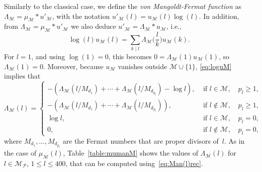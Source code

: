 \documentclass[11pt, a4paper]{article}
\newcommand{\calM}{\mathcal{M}}
\newcommand{\manM}{\Lambda_{\calM}}
\newcommand{\uM}{u_\calM}
\newcommand{\muM}{\mu_\calM}
\newcommand{\Mp}{\calM_{\mathcal{P}}}
\theoremstyle{plain}
\theoremstyle{definition}
\begin{document}
Similarly to the classical case, we define the \textit{von Mangoldt-Fermat function} as $\manM = \muM * u'_\calM$,
with the notation $u'_\calM(l) = \uM(l) \log(l)$.
In addition, from $\manM = \muM * u'_\calM$ we also deduce $u'_\calM = \manM * \uM$, i.e.,
\begin{equation}
\label{eq:loguM}
  \log(l) \uM (l) = \sum_{k \mid l} \manM\Big(\frac{l}{k}\Big)\uM(k).
\end{equation}
For $l=1$, and using $\log(1)=0$, this becomes $0 = \manM(1) \uM(1)$, so $\manM(1)=0$.
Moreover, because $\uM$ vanishes outside $\calM \cup \{1\}$, \eqref{eq:loguM} implies that
\begin{equation}
\label{eq:Man(l)rec}
  \manM(l) = 
  \begin{cases}
    -(\manM({l}/{M_{d_1}}) + \cdots + \manM({l}/{M_{d_{p_l}}}) - \log l),
    & \text{ if } l\in \calM, \quad p_{l} \geq 1, \\ 
    -(\manM({l}/{M_{d_1}}) + \cdots + \manM({l}/{M_{d_{p_l}}})),
    & \text{ if } l\notin \calM, \quad p_{l} \geq 1, \\ 
    \log l,
    & \text{ if } l\in \calM, \quad p_{l} = 0, \\ 
    0,
    & \text{ if } l\notin \calM, \quad p_{l} = 0,
  \end{cases}
\end{equation}
where $M_{d_1},\dots, M_{d_{p_l}}$ are the Fermat numbers that are proper divisors of~$l$.
As in the case of $\muM(l)$, 
Table~\ref{table:mumanM} shows the values of $\manM(l)$ for $l \in \Mp$, $1 \le l \le 400$,
that can be computed using~\eqref{eq:Man(l)rec}.
\end{document}
